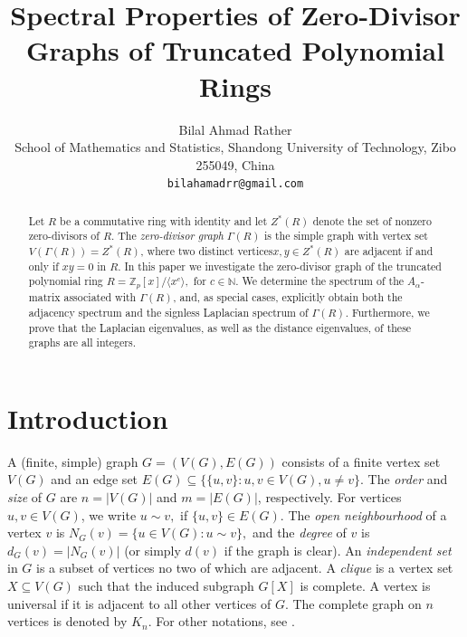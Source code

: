 \documentclass[12pt,twoside]{article}
\begin{document}
	\title{Spectral Properties of Zero-Divisor Graphs of Truncated Polynomial Rings}
	\author{{\small Bilal Ahmad Rather}\\[2mm]
		{\small School of Mathematics and Statistics, Shandong University of Technology, Zibo 255049, China}\\
		\small \texttt{bilahamadrr@gmail.com}
					}
	\date{}
	
	\pagestyle{myheadings} 
	\maketitle
	\begin{abstract}
		Let $R$ be a commutative ring with identity and let $Z^{\ast}(R)$ denote the set of nonzero zero-divisors of $R$.
		The \emph{zero-divisor graph} $ \varGamma(R)$ is the simple graph with vertex set $V( \varGamma(R))=Z^{\ast}(R)$, where two distinct vertices$x,y\in Z^{\ast}(R)$ are adjacent if and only if $xy=0$ in $R$. In this paper we investigate the zero-divisor graph of the truncated polynomial ring $R=\mathbb{Z}_{p}[x]/\langle x^{c}\rangle,$ for $c\in\mathbb{N}.$ We determine the spectrum of the $A_{\alpha}$-matrix associated with $ \varGamma(R)$, and, as special cases, explicitly obtain both the adjacency spectrum and the signless Laplacian spectrum of $ \varGamma(R)$. Furthermore, we prove that the Laplacian eigenvalues, as well as the distance eigenvalues, of these graphs are all integers.
	\end{abstract}
	
	
	\vskip 3mm
	
	\section{Introduction}
	
	A (finite, simple) graph $G=(V(G),E(G))$ consists of a finite vertex set $V(G)$ and an edge set
	$E(G)\subseteq \{\{u,v\}:u,v\in V(G), u\neq v\}$. The \emph{order} and \emph{size} of $G$ are
	$n=|V(G)|$ and $m=|E(G)|$, respectively. For vertices $u,v\in V(G)$, we write $u\sim v,$ if
	$\{u,v\}\in E(G)$. The \emph{open neighbourhood} of a vertex $v$ is $N_G(v) = \{u\in V(G):u\sim v\},$
	and the \emph{degree} of $v$ is $d_G(v)=|N_G(v)|$ (or simply $d(v)$ if the graph is clear).
	An \emph{independent set} in $G$ is a subset of vertices no two of which are adjacent. A
	\emph{clique} is a vertex set $X\subseteq V(G)$ such that the induced subgraph $G[X]$ is
	complete. A vertex is universal if it is adjacent to all other vertices of $G$. The complete graph on $n$ vertices is denoted by $K_n$. For other notations, see \cite{cds}.
	
\end{document}

